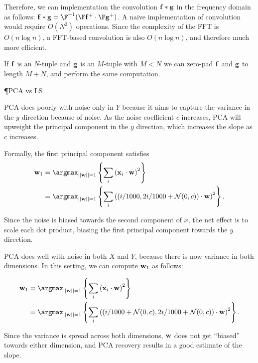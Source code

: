 \documentclass[8pt]{article}
\begin{document}
        Therefore, we can implementation the convolution $\mathbf{f} * \mathbf{g}$ in the frequency domain as follows: $\mbf{f} * \mbf{g} = \F^{-1} (\F \mbf{f}^{+} \cdot \F \mbf{g}^{+})$.
          A naive implementation of convolution would require $O(N^2)$ operations.  Since the complexity of the FFT is $O(n \log n)$, a FFT-based convolution is also $O(n \log n)$, and therefore much more efficient.

          If $\mathbf{f}$ is an $N$-tuple and $\mathbf{g}$ is an $M$-tuple with $M < N$ we can zero-pad $\mathbf{f}$ and $\mathbf{g}$ to length $M+N$, and perform the same computation.

          \P{PCA vs LS}

    \item PCA does poorly with noise only in $Y$ because it aims to capture the variance in the $y$ direction because of noise.  As the noise coefficient $c$ increases, PCA will upweight the principal component in the $y$ direction, which increases the slope as $c$ increases.

      Formally, the first principal component satisfies
      \begin{align*}
        \mbf{w}_{1} & = \argmax_{||\mbf{w}||=1} \left\{ \sum_{i} \left( \mbf{x}_i \cdot \mbf{w} \right)^2 \right\} \\
        &=  \argmax_{||\mbf{w}||=1} \left\{ \sum_{i} \left( (i/1000, 2i/1000 + \mathcal{N}(0, c))\cdot \mbf{w} \right)^2 \right\}.
      \end{align*}

      Since the noise is biased towards the second component of $x$, the net effect is to scale each dot product, biasing the first principal component towards the $y$ direction.

    \item PCA does well with noise in both $X$ and $Y$, because there is now variance in both dimensions.  In this setting, we can compute $\mathbf{w}_1$ as follows:

      \begin{align*}
        \mbf{w}_{1} &= \argmax_{||\mbf{w}||=1} \left\{ \sum_{i} \left( \mbf{x}_i \cdot \mbf{w} \right)^2 \right\} \\
        &= \argmax_{||\mbf{w}||=1} \left\{ \sum_{i} \left( (i/1000 + \mathcal{N}(0, c), 2i/1000 + \mathcal{N}(0, c))\cdot \mbf{w} \right)^2 \right\}.
      \end{align*}

      Since the variance is spread across both dimensions, $\mathbf{w}$ does not get ``biased'' towards either dimension, and PCA recovery results in a good estimate of the slope.
\end{document}
